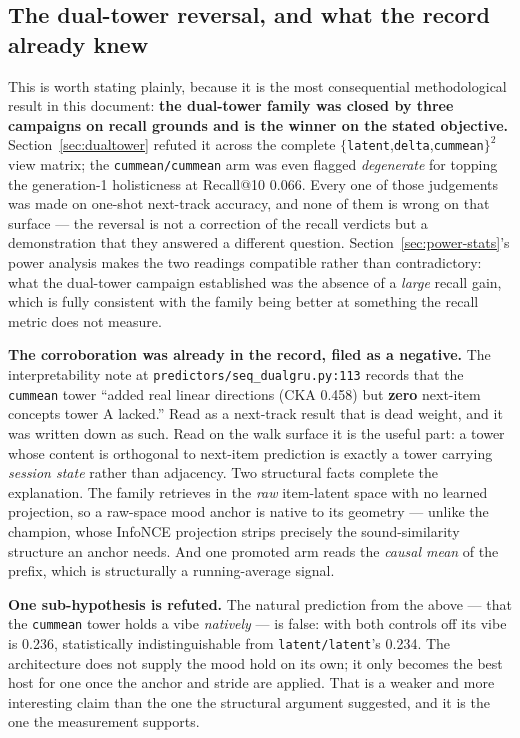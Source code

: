 \documentclass[11pt]{article}
\begin{document}
\subsection{The dual-tower reversal, and what the record already knew}
\label{sec:walk-reversal}
This is worth stating plainly, because it is the most consequential
methodological result in this document: \textbf{the dual-tower family was closed
by three campaigns on recall grounds and is the winner on the stated
objective.} Section~\ref{sec:dualtower} refuted it across the complete
$\{$\texttt{latent},\texttt{delta},\texttt{cummean}$\}^2$ view matrix; the
\texttt{cummean/cummean} arm was even flagged \emph{degenerate} for topping the
generation-1 holisticness at Recall@10 \num{0.066}. Every one of those judgements
was made on one-shot next-track accuracy, and none of them is wrong on that
surface --- the reversal is not a correction of the recall verdicts but a
demonstration that they answered a different question. Section~\ref{sec:power-stats}'s
power analysis makes the two readings compatible rather than contradictory: what
the dual-tower campaign established was the absence of a \emph{large} recall
gain, which is fully consistent with the family being better at something the
recall metric does not measure.

\textbf{The corroboration was already in the record, filed as a negative.} The
interpretability note at \texttt{predictors/seq\_dualgru.py:113} records that the
\texttt{cummean} tower ``added real linear directions (CKA \num{0.458}) but
\textbf{zero} next-item concepts tower A lacked.'' Read as a next-track result
that is dead weight, and it was written down as such. Read on the walk surface it
is the useful part: a tower whose content is orthogonal to next-item prediction
is exactly a tower carrying \emph{session state} rather than adjacency. Two
structural facts complete the explanation. The family retrieves in the
\emph{raw} item-latent space with no learned projection, so a raw-space mood
anchor is native to its geometry --- unlike the champion, whose InfoNCE
projection strips precisely the sound-similarity structure an anchor needs. And
one promoted arm reads the \emph{causal mean} of the prefix, which is
structurally a running-average signal.

\textbf{One sub-hypothesis is refuted.} The natural prediction from the above ---
that the \texttt{cummean} tower holds a vibe \emph{natively} --- is false: with
both controls off its vibe is \num{0.236}, statistically indistinguishable from
\texttt{latent/latent}'s \num{0.234}. The architecture does not supply the mood
hold on its own; it only becomes the best host for one once the anchor and stride
are applied. That is a weaker and more interesting claim than the one the
structural argument suggested, and it is the one the measurement supports.
\end{document}
